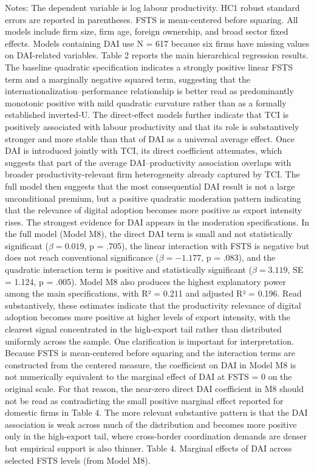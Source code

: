 \documentclass[12pt,a4paper]{article}
\begin{document}
Notes: The dependent variable is log labour productivity. HC1 robust
standard errors are reported in parentheses. FSTS is mean-centered
before squaring. All models include firm size, firm age, foreign
ownership, and broad sector fixed effects. Models containing DAI use N =
617 because six firms have missing values on DAI-related variables.
Table 2 reports the main hierarchical regression results. The baseline
quadratic specification indicates a strongly positive linear FSTS term
and a marginally negative squared term, suggesting that the
internationalization--performance relationship is better read as
predominantly monotonic positive with mild quadratic curvature rather
than as a formally established inverted-U. The direct-effect models
further indicate that TCI is positively associated with labour
productivity and that its role is substantively stronger and more stable
than that of DAI as a universal average effect. Once DAI is introduced
jointly with TCI, its direct coefficient attenuates, which suggests that
part of the average DAI--productivity association overlaps with broader
productivity-relevant firm heterogeneity already captured by TCI. The
full model then suggests that the most consequential DAI result is not a
large unconditional premium, but a positive quadratic moderation pattern
indicating that the relevance of digital adoption becomes more positive
as export intensity rises. The strongest evidence for DAI appears in the
moderation specifications. In the full model (Model M8), the direct DAI
term is small and not statistically significant (\(\beta = 0.019\), p =
.705), the linear interaction with FSTS is negative but does not reach
conventional significance (\(\beta = −1.177\), p = .083), and the
quadratic interaction term is positive and statistically significant
(\(\beta = 3.119\), SE = 1.124, p = .005). Model M8 also produces the
highest explanatory power among the main specifications, with R² = 0.211
and adjusted R² = 0.196. Read substantively, these estimates indicate
that the productivity relevance of digital adoption becomes more
positive at higher levels of export intensity, with the clearest signal
concentrated in the high-export tail rather than distributed uniformly
across the sample. One clarification is important for interpretation.
Because FSTS is mean-centered before squaring and the interaction terms
are constructed from the centered measure, the coefficient on DAI in
Model M8 is not numerically equivalent to the marginal effect of DAI at
FSTS = 0 on the original scale. For that reason, the near-zero direct
DAI coefficient in M8 should not be read as contradicting the small
positive marginal effect reported for domestic firms in Table 4. The
more relevant substantive pattern is that the DAI association is weak
across much of the distribution and becomes more positive only in the
high-export tail, where cross-border coordination demands are denser but
empirical support is also thinner. Table 4. Marginal effects of DAI
across selected FSTS levels (from Model M8).
\end{document}
